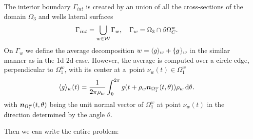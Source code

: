 The interior boundary $\Gamma_{int}$ is created by an union of all the cross-sections of the domain $\Omega_3$
and wells lateral surfaces
\begin{equation}
    \Gamma_{int} = \bigcup_{\substack{w\in\mathcal{W}}} \Gamma_w, \quad \Gamma_w = \Omega_3 \cap \partial\Omega^w_C.
\end{equation}
On $\Gamma_w$ we define the average decomposition $w = \langle g\rangle_w + \{g\}_w$ in the similar manner
as in the 1d-2d case. However, the average is computed over a circle edge, perpendicular to $\Omega^w_1$,
with its center at a~point $\nu_w(t)\in \Omega^w_1$
\begin{equation} \label{eqn:average_definition_3d}
    \langle g\rangle_w(t) = \frac{1}{2\pi\rho_w} \int_0^{2\pi} g (t + \rho_w \mathbf{\boldsymbol{n}}_{\Omega^w_1}(t,\theta)) \rho_w \,{\rm d} \theta.
\end{equation}
with $\mathbf{\boldsymbol{n}}_{\Omega^w_1}(t,\theta)$ being the unit normal vector of $\Omega^w_1$ at point $\nu_w(t)$ in the direction
determined by the angle $\theta$.

Then we can write the entire problem:

